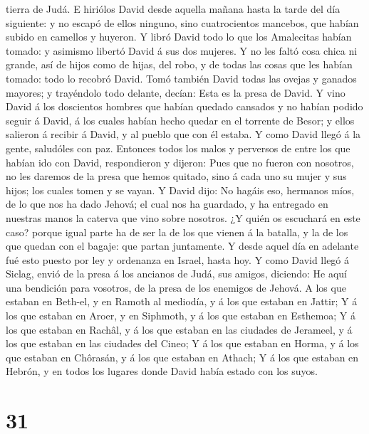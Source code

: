 tierra de Judá.  E hiriólos David desde aquella mañana
hasta la tarde del día siguiente: y no escapó de ellos ninguno, sino
cuatrocientos mancebos, que habían subido en camellos y huyeron.
 Y libró David todo lo que los Amalecitas habían tomado:
y asimismo libertó David á sus dos mujeres.  Y no les
faltó cosa chica ni grande, así de hijos como de hijas, del robo, y de
todas las cosas que les habían tomado: todo lo recobró David.
 Tomó también David todas las ovejas y ganados mayores; y
trayéndolo todo delante, decían: Esta es la presa de David.
 Y vino David á los doscientos hombres que habían quedado
cansados y no habían podido seguir á David, á los cuales habían hecho
quedar en el torrente de Besor; y ellos salieron á recibir á David, y al
pueblo que con él estaba. Y como David llegó á la gente, saludóles con
paz.  Entonces todos los malos y perversos de entre los
que habían ido con David, respondieron y dijeron: Pues que no fueron con
nosotros, no les daremos de la presa que hemos quitado, sino á cada uno
su mujer y sus hijos; los cuales tomen y se vayan.  Y
David dijo: No hagáis eso, hermanos míos, de lo que nos ha dado Jehová;
el cual nos ha guardado, y ha entregado en nuestras manos la caterva que
vino sobre nosotros.  ¿Y quién os escuchará en este caso?
porque igual parte ha de ser la de los que vienen á la batalla, y la de
los que quedan con el bagaje: que partan juntamente.  Y
desde aquel día en adelante fué esto puesto por ley y ordenanza en
Israel, hasta hoy.  Y como David llegó á Siclag, envió de
la presa á los ancianos de Judá, sus amigos, diciendo: He aquí una
bendición para vosotros, de la presa de los enemigos de Jehová.
 A los que estaban en Beth-el, y en Ramoth al mediodía, y
á los que estaban en Jattir;  Y á los que estaban en
Aroer, y en Siphmoth, y á los que estaban en Esthemoa;  Y
á los que estaban en Rachâl, y á los que estaban en las ciudades de
Jerameel, y á los que estaban en las ciudades del Cineo; 
Y á los que estaban en Horma, y á los que estaban en Chôrasán, y á los
que estaban en Athach;  Y á los que estaban en Hebrón, y
en todos los lugares donde David había estado con los suyos.

\hypertarget{section-30}{%
\section{31}\label{section-30}}


